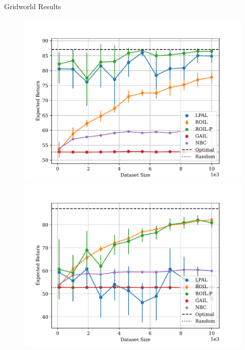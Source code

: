 \documentclass[final,a0paper]{beamer}
\begin{document}
\begin{frame}{}
\begin{columns}[t]
  \begin{column}{0.3\linewidth}
    \begin{block}{Gridworld Results}
        \begin{center}
            \begin{figure}
                \includegraphics[scale=1.5]{../../pres_roil/plots/returns/40x40_gridworld_on_policy_returns.pdf}
                \includegraphics[scale=1.5]{../../pres_roil/plots/returns/40x40_gridworld_off_policy_returns.pdf}
            \end{figure}
        \end{center}
    \end{block}
  \end{column}
\end{columns}
\end{frame}
\end{document}
